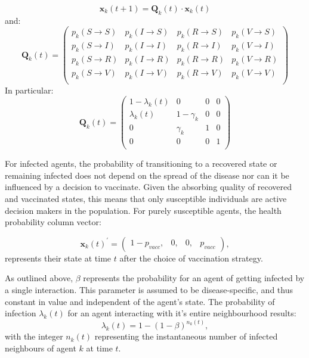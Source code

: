 \documentclass[11pt]{article}
\begin{document}
\begin{equation}\label{eq:1}
	 \mathbf{x}_k(t+1) = \mathbf{Q}_k(t) \cdot \mathbf{x}_k(t)
\end{equation}
and:
\begin{equation}\label{eq:2}
	 \mathbf{Q}_k(t) = 
	 \left (\begin{array}{cccc} p_{k}(S\rightarrow{}S)&p_{k}(I\rightarrow{}S)&p_{k}(R\rightarrow{}S)&p_{k}(V\rightarrow{}S) \\
	 	p_{k}(S\rightarrow{}I)&p_{k}(I\rightarrow{}I)&p_{k}(R\rightarrow{}I)&p_{k}(V\rightarrow{}I) \\
		p_{k}(S\rightarrow{}R)&p_{k}(I\rightarrow{}R)&p_{k}(R\rightarrow{}R)&p_{k}(V\rightarrow{}R) \\
		p_{k}(S\rightarrow{}V)&p_{k}(I\rightarrow{}V)&p_{k}(R\rightarrow{}V)&p_{k}(V\rightarrow{}V) \\
	  \end{array} \right)
\end{equation}
In particular: 
\begin{equation}\label{eq:3}			
	 \mathbf{Q}_k(t) = 
	 \left (\begin{array}{cccc} 1-\lambda_{k}(t)&0&0&0 \\
	 	\lambda_{k}(t)&1-\gamma_{k}&0&0 \\
		0&\gamma_{k}&1&0 \\
		0&0&0&1 \\
	  \end{array} \right)
\end{equation}

For infected agents, the probability of transitioning to a recovered state or remaining infected does not depend on the spread of the disease nor can it be influenced by a decision to vaccinate. Given the absorbing quality of recovered and vaccinated states, this means that only susceptible individuals are active decision makers in the population. For purely susceptible agents, the health probability column vector:

\begin{equation}\label{eq:4}
	\mathbf{x}_k(t)^{'}=\left(\begin{array}{cccc} 1-p_{vacc},&0,&0,&p_{vacc}  \end{array} \right),
\end{equation} 
represents their state at time \(t\) after the choice of vaccination strategy. 

As outlined above, \(\beta\) represents the probability for an agent of getting infected by a single interaction. This parameter is assumed to be disease-specific, and thus constant in value and independent of the agent's state. The probability of infection \(\lambda_{k}(t)\) for an agent interacting with it's entire neighbourhood results:
\begin{equation}\label{eq:5}
	\lambda_{k}(t)=1-(1-\beta)^{n_{k}(t)},
\end{equation}
with the integer \(n_{k}(t)\) representing the instantaneous number of infected neighbours of agent \(k\) at time \(t\). 
\end{document}
